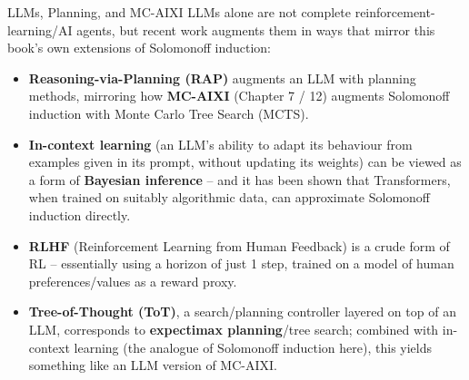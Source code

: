 \documentclass[aspectratio=169,10pt]{beamer}
\begin{document}
\begin{frame}{LLMs, Planning, and MC-AIXI}
  LLMs alone are not complete reinforcement-learning/AI agents, but recent
  work augments them in ways that mirror this book's own extensions of
  Solomonoff induction:
  \begin{itemize}
    \item \textbf{Reasoning-via-Planning (RAP)} augments an LLM with
      planning methods, mirroring how \textbf{MC-AIXI} (Chapter 7 / 12)
      augments Solomonoff induction with Monte Carlo Tree Search (MCTS).
    \item \textbf{In-context learning} (an LLM's ability to adapt its
      behaviour from examples given in its prompt, without updating its
      weights) can be viewed as a form of \textbf{Bayesian inference} --
      and it has been shown that Transformers, when trained on suitably
      algorithmic data, can approximate Solomonoff induction directly.
    \item \textbf{RLHF} (Reinforcement Learning from Human Feedback) is a
      crude form of RL -- essentially using a horizon of just 1 step,
      trained on a model of human preferences/values as a reward proxy.
    \item \textbf{Tree-of-Thought (ToT)}, a search/planning controller
      layered on top of an LLM, corresponds to \textbf{expectimax
      planning}/tree search; combined with in-context learning (the
      analogue of Solomonoff induction here), this yields something like an
      LLM version of MC-AIXI.
  \end{itemize}
\end{frame}
\end{document}
